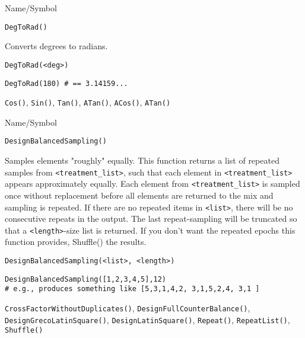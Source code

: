 \begin{desc}{Name/Symbol}
\item[Name/Symbol]  	\verb+DegToRad()+

\item[Description]  	Converts degrees to radians.

\item[Usage]
\begin{verbatim}
DegToRad(<deg>)
\end{verbatim}

\item[Example]     	
\begin{verbatim}
DegToRad(180) # == 3.14159...
\end{verbatim}

\item[See Also]    	\verb+Cos()+, \verb+Sin()+, \verb+Tan()+, \verb+ATan()+, \verb+ACos()+, \verb+ATan()+ 
\end{desc}

\rl



\begin{desc}{Name/Symbol}
\item[Name/Symbol]  	\verb+DesignBalancedSampling()+

\item[Description] 	Samples elements "roughly" equally.
  		This function returns a list of repeated samples from
 		\verb+<treatment_list>+, such that each element in \verb+<treatment_list>+ 
		appears approximately equally.  Each element from 
		\verb+<treatment_list>+ is sampled once without replacement before 
		all elements are returned to the mix and sampling is repeated.  
		If there are no repeated items in \verb+<list>+, there will be no
 		consecutive repeats in the output.  The last repeat-sampling 
		will be truncated so that a \verb+<length>+-size list is returned.  
		If you don't want the repeated epochs this function provides, 
		Shuffle() the results.

\item[Usage]
\begin{verbatim}
DesignBalancedSampling(<list>, <length>)
\end{verbatim}

\item[Example]
\begin{verbatim}
DesignBalancedSampling([1,2,3,4,5],12)
# e.g., produces something like [5,3,1,4,2, 3,1,5,2,4, 3,1 ]
\end{verbatim}

\item[See Also]	\verb+CrossFactorWithoutDuplicates()+, \verb+DesignFullCounterBalance()+,
  		\verb+DesignGrecoLatinSquare()+, \verb+DesignLatinSquare()+, \verb+Repeat()+, 
		\verb+RepeatList()+, \verb+Shuffle()+

\end{desc}

